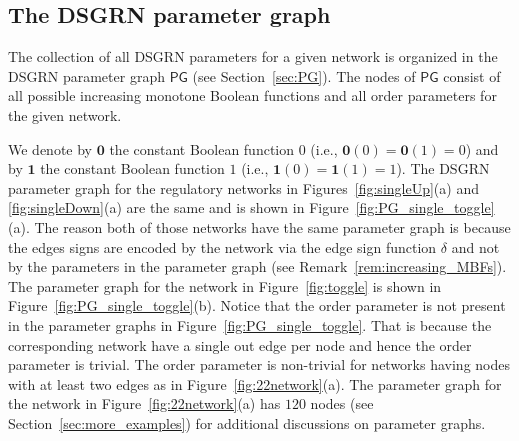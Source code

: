 \documentclass[12pt, notitlepage]{amsart}
\theoremstyle{definition}
\newcommand{\PG}{\mathsf{PG}}
\begin{document}
  \subsection{The DSGRN parameter graph}

  The collection of all DSGRN parameters for a given network is organized in the DSGRN parameter graph $\PG$ (see Section~\ref{sec:PG}). The nodes of $\PG$ consist of all possible increasing monotone Boolean functions and all order parameters for the given network.

  We denote by ${\mathbf 0}$ the constant Boolean function $0$ (i.e., ${\mathbf 0}(0) = {\mathbf 0}(1) = 0$) and by ${\mathbf 1}$ the constant Boolean function $1$ (i.e., ${\mathbf 1}(0) = {\mathbf 1}(1) = 1$). The DSGRN parameter graph for the regulatory networks in Figures~\ref{fig:singleUp}(a) and \ref{fig:singleDown}(a) are the same and is shown in Figure~\ref{fig:PG_single_toggle}(a). The reason both of those networks have the same parameter graph is because the edges signs are encoded by the network via the edge sign function $\delta$ and not by the parameters in the parameter graph (see Remark~\ref{rem:increasing_MBFs}). The parameter graph for the network in Figure~\ref{fig:toggle} is shown in Figure~\ref{fig:PG_single_toggle}(b). Notice that the order parameter is not present in the parameter graphs in Figure~\ref{fig:PG_single_toggle}. That is because the corresponding network have a single out edge per node and hence the order parameter is trivial. The order parameter is non-trivial for networks having nodes with at least two edges as in Figure~\ref{fig:22network}(a). The parameter graph for the network in Figure~\ref{fig:22network}(a) has $120$ nodes (see Section~\ref{sec:more_examples}) for additional discussions on parameter graphs.
\end{document}

